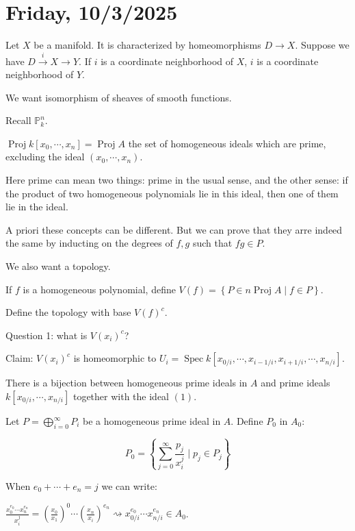 \documentclass{article}
\theoremstyle{definition}
\begin{document}
    \section*{Friday, 10/3/2025}
    
    Let \(X\) be a manifold. It is characterized by homeomorphisms \(D \to X\). Suppose we have \(D \xrightarrow{i} X \to Y\). If \(i\) is a coordinate neighborhood of \(X\), \(i\) is a coordinate neighborhood of \(Y\).

    We want isomorphism of sheaves of smooth functions.

    Recall \(\mathbb{P}^n_k\).
    
    \(\operatorname{Proj} k[x_0, \cdots , x_n] = \operatorname{Proj} A\) the set of homogeneous ideals which are prime, excluding the ideal \((x_0, \cdots , x_n)\).

    Here prime can mean two things: prime in the usual sense, and the other sense: if the product of two homogeneous polynomials lie in this ideal, then one of them lie in the ideal.

    A priori these concepts can be different. But we can prove that they arre indeed the same by inducting on the degrees of \(f,g\) such that \(fg\in P\).

    We also want a topology.

    If \(f\) is a homogeneous polynomial, define \(V(f) = \left\{ P \in n\operatorname{Proj} A \mid f\in P \right\}\).
    
    Define the topology with base \(V(f)^c\).

    Question 1: what is \(V(x_i)^{c}\)?

    Claim: \(V(x_i)^{c}\) is homeomorphic to \(U_i = \operatorname{Spec} k[x_{0 / i}, \cdots , x_{i-1 / i}, x_{i+1 / i}, \cdots , x_{n / i}]\).
    
    There is a bijection between homogeneous prime ideals in \(A\) and prime ideals \(k[x_{0 / i}, \cdots , x_{n / i}]\) together with the ideal \((1)\).
    
    Let \(P = \bigoplus_{i=0}^{\infty} P_i\) be a homogeneous prime ideal in \(A\). Define \(P_0\) in \(A_0\):

    \[
        P_0 = \left\{ \sum_{j=0}^{\infty} \frac{p_j}{x_i^j} \mid p_j \in P_j \right\} 
    \]

    When \(e_0 + \cdots + e_n = j\) we can write:

    \(\frac{x_0^{e_0} \cdots x_n^{e_n}}{x_i^j} = \left( \frac{x_0}{x_1} \right)^0 \cdots \left( \frac{x_n}{x_i} \right)^{e_n} \rightsquigarrow x_{0 / i}^{e_0} \cdots x_{n / i}^{e_n} \in A_0\).
    
\end{document}
